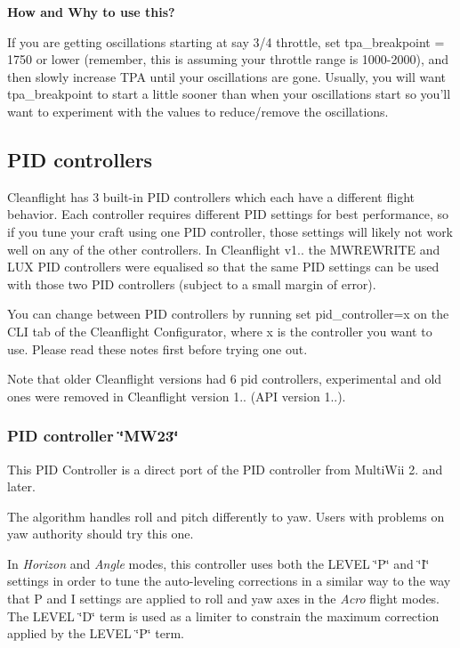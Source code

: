 {\bfseries How and Why to use this?}

If you are getting oscillations starting at say 3/4 throttle, set {\ttfamily tpa\+\_\+breakpoint} = 1750 or lower (remember, this is assuming your throttle range is 1000-\/2000), and then slowly increase T\+P\+A until your oscillations are gone. Usually, you will want {\ttfamily tpa\+\_\+breakpoint} to start a little sooner than when your oscillations start so you'll want to experiment with the values to reduce/remove the oscillations.

\subsection*{P\+I\+D controllers}

Cleanflight has 3 built-\/in P\+I\+D controllers which each have a different flight behavior. Each controller requires different P\+I\+D settings for best performance, so if you tune your craft using one P\+I\+D controller, those settings will likely not work well on any of the other controllers. In Cleanflight v1.. the M\+W\+R\+E\+W\+R\+I\+T\+E and L\+U\+X P\+I\+D controllers were equalised so that the same P\+I\+D settings can be used with those two P\+I\+D controllers (subject to a small margin of error).

You can change between P\+I\+D controllers by running {\ttfamily set pid\+\_\+controller=x} on the C\+L\+I tab of the Cleanflight Configurator, where {\ttfamily x} is the controller you want to use. Please read these notes first before trying one out.

Note that older Cleanflight versions had 6 pid controllers, experimental and old ones were removed in Cleanflight version 1.. (A\+P\+I version 1..).

\subsubsection*{P\+I\+D controller \char`\"{}\+M\+W23\char`\"{}}

This P\+I\+D Controller is a direct port of the P\+I\+D controller from Multi\+Wii 2. and later.

The algorithm handles roll and pitch differently to yaw. Users with problems on yaw authority should try this one.

In {\itshape Horizon} and {\itshape Angle} modes, this controller uses both the L\+E\+V\+E\+L \char`\"{}\+P\char`\"{} and \char`\"{}\+I\char`\"{} settings in order to tune the auto-\/leveling corrections in a similar way to the way that P and I settings are applied to roll and yaw axes in the {\itshape Acro} flight modes. The L\+E\+V\+E\+L \char`\"{}\+D\char`\"{} term is used as a limiter to constrain the maximum correction applied by the L\+E\+V\+E\+L \char`\"{}\+P\char`\"{} term.

